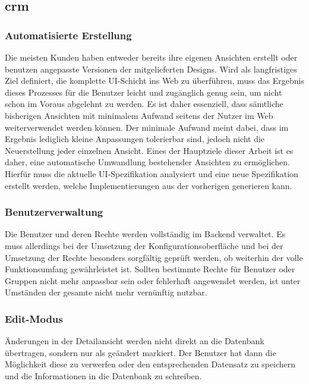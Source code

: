 \subsection{\acrlong{crm}}
\subsubsection{Automatisierte Erstellung}
Die meisten Kunden haben entweder bereits ihre eigenen Ansichten erstellt oder benutzen angepasste Versionen der mitgelieferten Designs. Wird als langfristiges Ziel definiert, die komplette UI-Schicht ins Web zu überführen, muss das Ergebnis dieses Prozesses für die Benutzer leicht und zugänglich genug sein, um nicht schon im Voraus abgelehnt zu werden. Es ist daher essenziell, dass sämtliche bisherigen Ansichten mit minimalem Aufwand seitens der Nutzer im Web weiterverwendet werden können. Der minimale Aufwand meint dabei, dass im Ergebnis lediglich kleine Anpassungen tolerierbar sind, jedoch nicht die Neuerstellung jeder einzelnen Ansicht. Eines der Hauptziele dieser Arbeit ist es daher, eine automatische Umwandlung bestehender Ansichten zu ermöglichen. Hierfür muss die aktuelle UI-Spezifikation analysiert und eine neue Spezifikation erstellt werden, welche Implementierungen aus der vorherigen generieren kann.

\subsubsection{Benutzerverwaltung}
Die Benutzer und deren Rechte werden vollständig im Backend verwaltet. Es muss allerdings bei der Umsetzung der Konfigurationsoberfläche und bei der Umsetzung der Rechte besonders sorgfältig geprüft werden, ob weiterhin der volle Funktionsumfang gewährleistet ist. Sollten bestimmte Rechte für Benutzer oder Gruppen nicht mehr anpassbar sein  oder fehlerhaft angewendet werden, ist unter Umständen der gesamte  nicht mehr vernünftig nutzbar.

\subsubsection{Edit-Modus}
Änderungen in der Detailansicht werden nicht direkt an die Datenbank übertragen, sondern nur als geändert markiert. Der Benutzer hat dann die Möglichkeit diese zu verwerfen oder den entsprechenden Datensatz zu speichern und die Informationen in die Datenbank zu schreiben.

